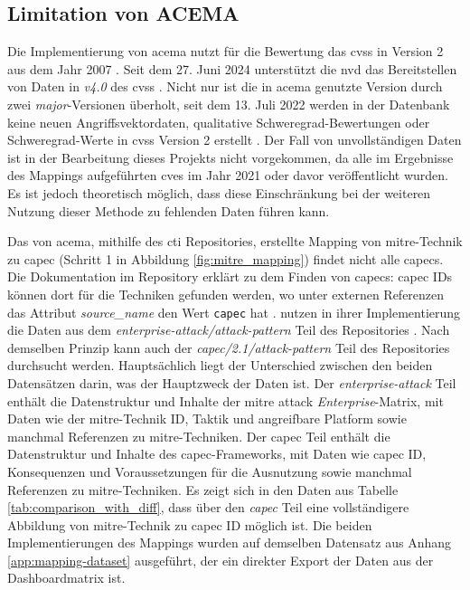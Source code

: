 \subsection{Limitation von ACEMA}
\label{limitationen-acema}
Die Implementierung von \gls{acema} nutzt für die Bewertung das \gls{cvss} in Version 2 aus dem Jahr 2007 \autocite{Acema_oranOCloud_Data_GatheringpyMaster}. Seit dem 27. Juni 2024 unterstützt die \gls{nvd} das Bereitstellen von Daten in \textit{v4.0} des \gls{cvss} \autocite{NVDCVSSV40}. Nicht nur ist die in \gls{acema} genutzte Version durch zwei \textit{major}-Versionen überholt, seit dem 13. Juli 2022 werden in der Datenbank keine neuen Angriffsvektordaten, qualitative Schweregrad-Bewertungen oder Schweregrad-Werte in \gls{cvss} Version 2 erstellt \autocite{RetirementCVSSV2}. Der Fall von unvollständigen Daten ist in der Bearbeitung dieses Projekts nicht vorgekommen, da alle im Ergebnisse des Mappings aufgeführten \glspl{cve} im Jahr 2021 oder davor veröffentlicht wurden. Es ist jedoch theoretisch möglich, dass diese Einschränkung bei der weiteren Nutzung dieser Methode zu fehlenden Daten führen kann.
%
\par Das von \gls{acema}, mithilfe des \gls{cti} Repositories, erstellte Mapping von \gls{mitre}-Technik zu \gls{capec} (Schritt 1 in Abbildung \ref{fig:mitre_mapping}) findet nicht alle \glspl{capec}. Die Dokumentation im Repository erklärt zu dem Finden von \glspl{capec}: \gls{capec} IDs können dort für die Techniken gefunden werden, wo unter externen Referenzen das Attribut \textit{source\_name} den Wert \verb|capec| hat \autocite{CtiUSAGEmdMaster} \autocite{CtiUSAGECAPECmdMaster}. \citeauthor{klementSecuring6GTransition2024} nutzen in ihrer Implementierung die Daten aus dem \textit{enterprise-attack/attack-pattern} Teil des Repositories \autocite{klement2023acema}. Nach demselben Prinzip kann auch der \textit{capec/2.1/attack-pattern} Teil des Repositories durchsucht werden. Hauptsächlich liegt der Unterschied zwischen den beiden Datensätzen darin, was der Hauptzweck der Daten ist. Der \textit{enterprise-attack} Teil enthält die Datenstruktur und Inhalte der \gls{mitre} \gls{attack} \textit{Enterprise}-Matrix, mit Daten wie der \gls{mitre}-Technik ID, Taktik und angreifbare Platform sowie manchmal Referenzen zu \gls{mitre}-Techniken. Der \gls{capec} Teil enthält die Datenstruktur und Inhalte des \gls{capec}-Frameworks, mit Daten wie \gls{capec} ID, Konsequenzen und Voraussetzungen für die Ausnutzung sowie manchmal Referenzen zu \gls{mitre}-Techniken. Es zeigt sich in den Daten aus Tabelle \ref{tab:comparison_with_diff}, dass über den \textit{\gls{capec}} Teil eine vollständigere Abbildung von \gls{mitre}-Technik zu \gls{capec} ID möglich ist. Die beiden Implementierungen des Mappings wurden auf demselben Datensatz aus Anhang \ref{app:mapping-dataset} ausgeführt, der ein direkter Export der Daten aus der Dashboardmatrix ist.
%

